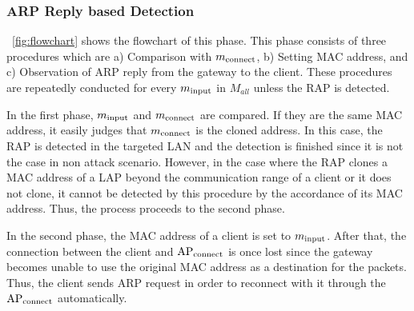 \documentclass[conference]{IEEEtran}
\newcommand{\tarAP}{\rm AP_{connect}}
\newcommand{\tarMAC}{m_{\rm connect}}
\newcommand{\inputMAC}{m_{\rm input}}
\begin{document}
\subsubsection{ARP Reply based Detection}
\figurename~\ref{fig:flowchart} shows the flowchart of this phase.
This phase consists of three procedures which are a) Comparison with $\tarMAC$, b) Setting MAC address, and c) Observation of ARP reply from the gateway to the client.
These procedures are repeatedly conducted for every $\inputMAC$  in $M_{all}$ unless the RAP is detected.

In the first phase, $\inputMAC$ and $\tarMAC$ are compared.
If they are the same MAC address, it easily judges that $\tarMAC$ is the cloned address.
In this case, the RAP is detected in the targeted LAN and the detection is finished since it is not the case in non attack scenario.
However, in the case where the RAP clones a MAC address of a LAP beyond the communication range of a client or it does not clone, it cannot be detected by this procedure by the accordance of its MAC address.
Thus, the process proceeds to the second phase.

In the second phase, the MAC address of a client is set to $\inputMAC$.
After that, the connection between the client and $\tarAP$ is once lost since the gateway becomes unable to use the original MAC address as a destination for the packets.
Thus, the client sends ARP request in order to reconnect with it through the $\tarAP$ automatically.
\end{document}
